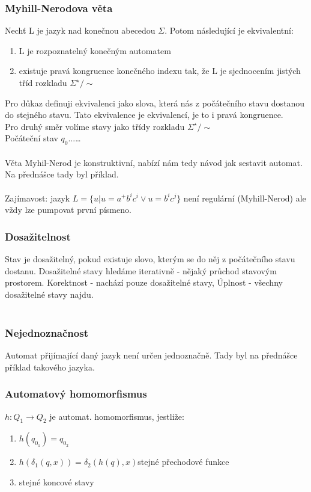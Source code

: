 \documentclass{article}
\begin{document}
\subsubsection*{Myhill-Nerodova věta}
Nechť L je jazyk nad konečnou abecedou $\Sigma$. Potom následující je ekvivalentní:
\begin{enumerate}
    \item L je rozpoznatelný konečným automatem
    \item existuje pravá kongruence konečného indexu tak, že L je sjednocením jistých tříd rozkladu $\Sigma^{\star} / \sim$
\end{enumerate}
Pro důkaz definuji ekvivalenci jako slova, která nás z počátečního stavu dostanou do stejného stavu. Tato ekvivalence
je ekvivalencí, je to i pravá kongruence.\\
Pro druhý směr volíme stavy jako třídy rozkladu $\Sigma^{\star} / \sim$\\
Počáteční stav $q_{0}$...\dots\\\\

Věta Myhil-Nerod je konstruktivní, nabízí nám tedy návod jak sestavit automat. Na přednášce tady byl příklad.\\\\

Zajímavost: jazyk $L = \{u|u = a^{+}b^{i}c^{i} \vee u = b^{i}c^{j}\}$ není regulární (Myhill-Nerod) ale vždy lze pumpovat
první písmeno.

\subsubsection*{Dosažitelnost}
Stav je dosažitelný, pokud existuje slovo, kterým se do něj z počátečního stavu dostanu. Dosažitelné stavy
hledáme iterativně - nějaký průchod stavovým prostorem. Korektnost - nachází pouze dosažitelné stavy, 
Úplnost - všechny dosažitelné stavy najdu.\\\\

\subsubsection*{Nejednoznačnost}
Automat přijímající daný jazyk není určen jednoznačně. Tady byl na přednášce příklad takového jazyka.

\subsubsection*{Automatový homomorfismus}
$h : Q_{1} \rightarrow Q_{2}$ je automat. homomorfismus, jestliže:\\
\begin{enumerate}
    \item $h(q_{0_{1}}) = q_{0_{2}}$
    \item $h(\delta_{1}(q,x)) = \delta_{2}(h(q),x)$stejné přechodové funkce
    \item stejné koncové stavy
\end{enumerate}
\end{document}
